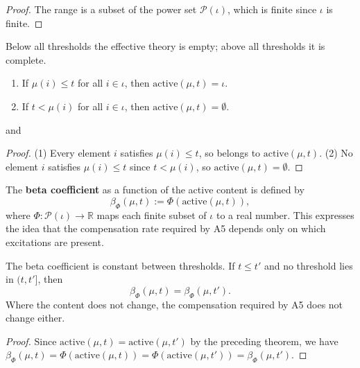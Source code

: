 \begin{proof}
The range is a subset of the power set $\mathcal{P}(\iota)$, which is finite since $\iota$ is finite.
\end{proof}

\begin{theorem}
Below all thresholds the effective theory is empty; above all thresholds it is complete.
\begin{enumerate}
\item If $\mu(i) \leq t$ for all $i \in \iota$, then $\text{active}(\mu, t) = \iota$.
\item If $t < \mu(i)$ for all $i \in \iota$, then $\text{active}(\mu, t) = \emptyset$.
\end{enumerate}
 and 
\end{theorem}

\begin{proof}
(1) Every element $i$ satisfies $\mu(i) \leq t$, so belongs to $\text{active}(\mu, t)$.
(2) No element $i$ satisfies $\mu(i) \leq t$ since $t < \mu(i)$, so $\text{active}(\mu, t) = \emptyset$.
\end{proof}

\begin{definition}
The \textbf{beta coefficient} as a function of the active content is defined by
\begin{equation}
\beta_\Phi(\mu, t) := \Phi(\text{active}(\mu, t)) ,
\end{equation}
where $\Phi : \mathcal{P}(\iota) \to \mathbb{R}$ maps each finite subset of $\iota$ to a real number. This expresses the idea that the compensation rate required by A5 depends only on which excitations are present.
\end{definition}

\begin{theorem}
The beta coefficient is constant between thresholds. If $t \leq t'$ and no threshold lies in $(t, t']$, then
\begin{equation}
\beta_\Phi(\mu, t) = \beta_\Phi(\mu, t') .
\end{equation}
Where the content does not change, the compensation required by A5 does not change either.
\end{theorem}

\begin{proof}
Since $\text{active}(\mu, t) = \text{active}(\mu, t')$ by the preceding theorem, we have $\beta_\Phi(\mu, t) = \Phi(\text{active}(\mu, t)) = \Phi(\text{active}(\mu, t')) = \beta_\Phi(\mu, t')$.
\end{proof}

